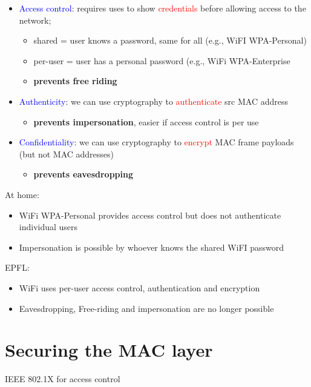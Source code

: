 \documentclass[11pt]{article}
\begin{document}
\begin{itemize}
	\item \textcolor{blue}{Access control}: requires uses to show \textcolor{red}{credentials} before allowing access to the network; 
		\begin{itemize}
			\item shared = user knows a password, same for all (e.g., WiFI WPA-Personal)
			\item per-user = user has a personal password (e.g., WiFi WPA-Enterprise
 			\item \textbf{prevents free riding}		
		\end{itemize}
	\item \textcolor{blue}{Authenticity}: we can use cryptography to \textcolor{red}{authenticate} src MAC address
		\begin{itemize}
			\item \textbf{prevents impersonation}, easier if access control is per use
		\end{itemize}
	\item \textcolor{blue}{Confidentiality}: we can use cryptography to \textcolor{red}{encrypt} MAC frame payloads (but not MAC addresses)
		\begin{itemize}
			\item \textbf{prevents eavesdropping}
		\end{itemize}
\end{itemize}

At home: 
\begin{itemize}
	\item WiFi WPA-Personal provides access control but does not authenticate individual users
	\item Impersonation is possible by whoever knows the shared WiFI password
\end{itemize}

EPFL:
\begin{itemize}
	\item WiFi uses per-user access control, authentication and encryption
	\item Eavesdropping, Free-riding and impersonation are no longer possible
\end{itemize}

\section*{Securing the MAC layer}

IEEE 802.1X for access control
\end{document}
